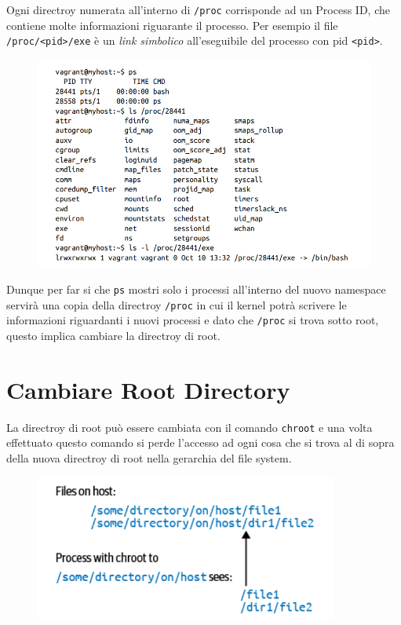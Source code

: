 Ogni directroy numerata all'interno di \verb|/proc| corrisponde ad un Process ID,
che contiene molte informazioni riguarante il processo. Per esempio il file
\verb|/proc/<pid>/exe| è un \textit{link simbolico} all'eseguibile del processo
con pid \verb|<pid>|.

\begin{figure}[H]
    \centering
    \includegraphics[width=12cm, keepaspectratio]{capitoli/os_security/imgs/pid7.png}
\end{figure}

Dunque per far si che \verb|ps| mostri solo i processi all'interno del nuovo
namespace servirà una copia della directroy \verb|/proc| in cui il kernel
potrà scrivere le informazioni riguardanti i nuovi processi e dato che
\verb|/proc| si trova sotto root, questo implica cambiare la directroy di root.

\section{Cambiare Root Directory}

La directroy di root può essere cambiata con il comando \verb|chroot| e
una volta effettuato questo comando si perde l'accesso ad ogni cosa che si trova
al di sopra della nuova directroy di root nella gerarchia del file system.

\begin{figure}[H]
    \centering
    \includegraphics[width=10cm, keepaspectratio]{capitoli/os_security/imgs/root1.png}
\end{figure}

